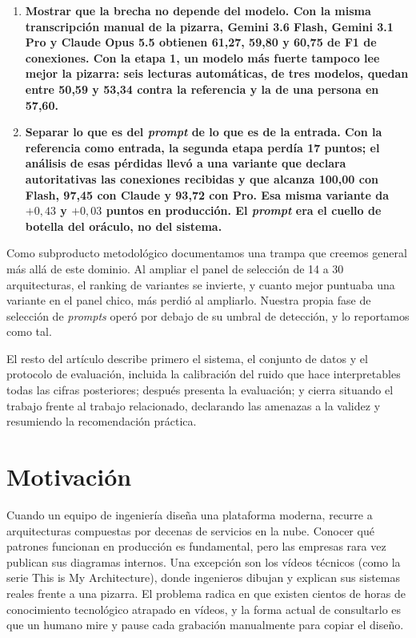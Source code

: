 \documentclass[a4paper, twocolumn, 10pt]{IEEEtran}
\newcommand{\nuevo}[1]{{\bfseries #1}}
\begin{document}
\begin{enumerate}
dependen de flujos caen un 28\,\% aunque la conclusión cualitativa sobreviva.
Además el pipeline aporta 61 arquitecturas que Cloudscape no contiene, 33 de
ellas de 2024.
\item \nuevo{\textbf{Mostrar que la brecha no depende del modelo.} Con la misma
transcripción manual de la pizarra, Gemini 3.6 Flash, Gemini 3.1 Pro y Claude Opus
5.5 obtienen 61,27, 59,80 y 60,75 de F1 de conexiones. Con la etapa 1, un modelo
más fuerte tampoco lee mejor la pizarra: seis lecturas automáticas, de tres modelos, quedan entre
50,59 y 53,34 contra la referencia y la de una persona en 57,60.}
\item \nuevo{\textbf{Separar lo que es del \emph{prompt} de lo que es de la
entrada.} Con la referencia como entrada, la segunda etapa perdía 17 puntos; el
análisis de esas pérdidas llevó a una variante que declara autoritativas las
conexiones recibidas y que alcanza 100,00 con Flash, 97,45 con Claude y 93,72 con
Pro. Esa misma variante da $+0{,}43$ y $+0{,}03$ puntos en producción. El
\emph{prompt} era el cuello de botella del oráculo, no del sistema.}
\end{enumerate}
 
Como subproducto metodológico documentamos una trampa que creemos general más
allá de este dominio. Al ampliar el panel de selección de 14 a 30 arquitecturas,
el ranking de variantes se invierte, y cuanto mejor puntuaba una variante en el
panel chico, más perdió al ampliarlo. Nuestra propia fase de selección de
\emph{prompts} operó por debajo de su umbral de detección, y lo reportamos como
tal.
 
El resto del artículo describe primero el sistema, el conjunto de datos y el protocolo de
evaluación, incluida la calibración del ruido que hace interpretables todas las
cifras posteriores; después presenta la evaluación; y cierra situando el trabajo
frente al trabajo relacionado, declarando las amenazas a la validez y resumiendo
la recomendación práctica.
 
\section{Motivación}
Cuando un equipo de ingeniería diseña una plataforma moderna, recurre a arquitecturas compuestas por decenas de servicios en la nube. Conocer qué patrones funcionan en producción es fundamental, pero las empresas rara vez publican sus diagramas internos. Una excepción son los vídeos técnicos (como la serie This is My Architecture), donde ingenieros dibujan y explican sus sistemas reales frente a una pizarra. El problema radica en que existen cientos de horas de conocimiento tecnológico atrapado en vídeos, y la forma actual de consultarlo es que un humano mire y pause cada grabación manualmente para copiar el diseño.
 
\end{document}
